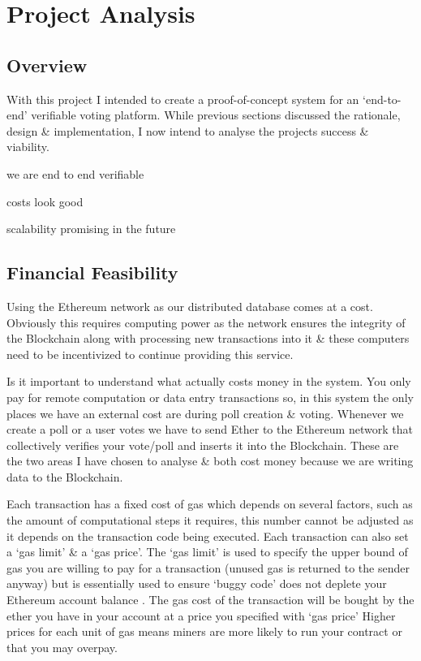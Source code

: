 \documentclass{article}
\begin{document}
    \section{Project Analysis}
    \subsection{Overview}
	With this project I intended to create a proof-of-concept system for an `end-to-end' verifiable voting platform. While previous sections discussed the rationale, design \& implementation, I now intend to analyse the projects success \& viability.

	we are end to end verifiable
	
	costs look good
	
	scalability promising in the future
	

    \cleardoublepage
    \subsection{Financial Feasibility}
	Using the Ethereum network as our distributed database comes at a cost. Obviously this requires computing power as the network ensures the integrity of the Blockchain along with processing new transactions into it \& these computers need to be incentivized to continue providing this service.
	
	Is it important to understand what actually costs money in the system. You only pay for remote computation or data entry transactions so, in this system the only places we have an external cost are during poll creation \& voting. Whenever we create a poll or a user votes we have to send Ether to the Ethereum network that collectively verifies your vote/poll and inserts it into the Blockchain. These are the two areas I have chosen to analyse \& both cost money because we are writing data to the Blockchain.
	
	Each transaction has a fixed cost of gas which depends on several factors, such as the amount of computational steps it requires, this number cannot be adjusted as it depends on the transaction code being executed. Each transaction can also set a `gas limit' \& a `gas price'. The `gas limit' is used to specify the upper bound of gas you are willing to pay for a transaction (unused gas is returned to the sender anyway) but is essentially used to ensure `buggy code' does not deplete your Ethereum account balance \citep{57_introduction_ethereum_frontier_guide_2017}. The gas cost of the transaction will be bought by the ether you have in your account at a price you specified with `gas price' Higher prices for each unit of gas means miners are more likely to run your contract or that you may overpay. 
	
\end{document}
